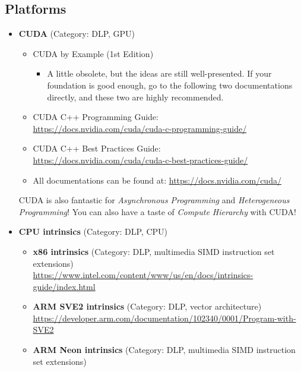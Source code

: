 \documentclass{article}
\begin{document}
\subsection{Platforms}
\begin{itemize}
    \item \textbf{CUDA} (Category: DLP, GPU)
    \begin{itemize}
        \item CUDA by Example (1st Edition) \cite{sanders2010cuda}
        \begin{itemize}
            \item A little obsolete, but the ideas are still well-presented.
            If your foundation is good enough, go to the following two documentations directly, and these two are highly recommended.
        \end{itemize}
        \item CUDA C++ Programming Guide:\\
        \href{https://docs.nvidia.com/cuda/cuda-c-programming-guide/}{https://docs.nvidia.com/cuda/cuda-c-programming-guide/}
        \item CUDA C++ Best Practices Guide:\\
        \href{https://docs.nvidia.com/cuda/cuda-c-best-practices-guide/}{https://docs.nvidia.com/cuda/cuda-c-best-practices-guide/}
        \item All documentations can be found at:
        \href{https://docs.nvidia.com/cuda/}{https://docs.nvidia.com/cuda/}
    \end{itemize}
    CUDA is also fantastic for \emph{Asynchronous Programming} and \emph{Heterogeneous Programming}!
    You can also have a taste of \emph{Compute Hierarchy} with CUDA!
    \item \textbf{CPU intrinsics} (Category: DLP, CPU)
    \begin{itemize}
        \item \textbf{x86 intrinsics} (Category: DLP, multimedia SIMD instruction set extensions)\\
        \href{https://www.intel.com/content/www/us/en/docs/intrinsics-guide/index.html}{https://www.intel.com/content/www/us/en/docs/intrinsics-guide/index.html}
        \item \textbf{ARM SVE2 intrinsics} (Category: DLP, vector architecture)\\
        \href{https://developer.arm.com/documentation/102340/0001/Program-with-SVE2}{https://developer.arm.com/documentation/102340/0001/Program-with-SVE2}
        \item \textbf{ARM Neon intrinsics} (Category: DLP, multimedia SIMD instruction set extensions)\\

\end{itemize}
\end{itemize}
\end{document}
